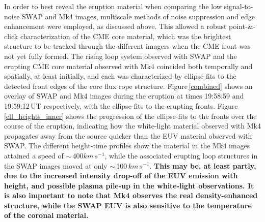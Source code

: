 \documentclass[namedreferences]{solarphysics}
\begin{document}
\begin{article}
In order to best reveal the eruption material when comparing the low signal-to-noise SWAP and Mk4 images, multiscale methods of noise suppression and edge enhancement were employed, as discussed above. This allowed a robust point-\&-click characterization of the CME core material, which was the brightest structure to be tracked through the different imagers when the CME front was not yet fully formed. The rising loop system observed with SWAP and the erupting CME core material observed with Mk4 coincided both temporally and spatially, at least initially, and each was characterized by ellipse-fits to the detected front edges of the core flux rope structure. Figure\,\ref{combined} shows an overlay of SWAP and Mk4 images during the eruption at times 19:58:59 and 19:59:12\,UT respectively, with the ellipse-fits to the erupting fronts. Figure\,\ref{ell_heights_inner} shows the progression of the ellipse-fits to the fronts over the course of the eruption, indicating how the white-light material observed with Mk4 propagates away from the source quicker than the EUV material observed with SWAP. The different height-time profiles show the material in the Mk4 images attained a speed of $\sim$\,400$km\,s^{-1}$, while the associated erupting loop structures in the SWAP images moved at only $\sim$\,100$\,km\,s^{-1}$. {\bf This may be, at least partly, due to the increased intensity drop-off of the EUV emission with height, and possible plasma pile-up in the white-light observations. It is also important to note that Mk4 observes the real density-enhanced structure, while the SWAP EUV is also sensitive to the temperature of the coronal material.} %



\end{article}
\end{document}

